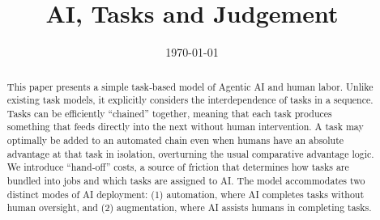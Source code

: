 \documentclass{article}
\theoremstyle{plain}
\theoremstyle{plain}
\begin{document}
\title{AI, Tasks and Judgement}
\date{\today{}}



\newcommand{\machine}[1]{\langle #1 \rangle}
\newcommand{\human}[1]{( #1 )}
\newcommand{\cost}[1]{T\{ #1 \}}
\newcommand{\costdo}[1]{T_H\{ #1 \}}
\newcommand{\costmanage}[1]{T_M\{ #1 \}}
\newcommand{\timecost}[1]{t_{#1}}
\newcommand{\hccost}[1]{c_{#1}}
\newcommand{\labor}[1]{l_{#1}}
\newcommand{\handofftime}[1]{t_{s#1}}
\newcommand{\humantime}[0]{t_{h}}
\newcommand{\machinetime}[0]{t_{m}}


\newcommand{\topic}[1]{\paragraph{#1}}

\renewcommand{\arraystretch}{1.75} %

\maketitle

\begin{abstract}
\noindent
This paper presents a simple task‐based model of Agentic AI and human labor.  
Unlike existing task models, it explicitly considers the interdependence of tasks in a sequence.  
Tasks can be efficiently ``chained'' together, meaning that each task produces something that feeds directly into the next without human intervention.  
A task may optimally be added to an automated chain even when humans have an absolute advantage at that task in isolation, overturning the usual comparative advantage logic.  
We introduce ``hand‐off'' costs, a source of friction that determines how tasks are bundled into jobs and which tasks are assigned to AI.
The model accommodates two distinct modes of AI deployment: (1) automation, where AI completes tasks without human oversight, and (2) augmentation, where AI assists humans in completing tasks.
\end{abstract}
\end{document}
